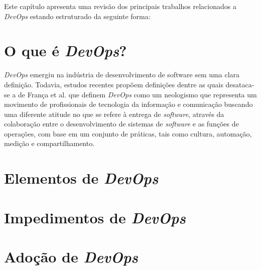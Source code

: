 \newcommand{\texCommand}[1]{\texttt{\textbackslash{#1}}}%

\newcommand{\exemplo}[1]{%
\vspace{\baselineskip}%
\noindent\fbox{\begin{minipage}{\textwidth}#1\end{minipage}}%
\\\vspace{\baselineskip}}%

\newcommand{\exemploVerbatim}[1]{%
\vspace{\baselineskip}%
\noindent\fbox{\begin{minipage}{\textwidth}%
#1\end{minipage}}%
\\\vspace{\baselineskip}}%

Este capítulo apresenta uma revisão dos principais trabalhos relacionados a
\textit{DevOps} estando estruturado da seguinte forma:

\section{O que é \textit{DevOps}?}

\textit{DevOps} emergiu na indústria de desenvolvimento de software sem uma
clara definição. Todavia, estudos recentes propõem definições
dentre as quais desataca-se a de França et al. \cite{characterizing_devops}
que definem \textit{DevOps} como um neologismo que representa um movimento de
profissionais de tecnologia da informação e comunicação buscando uma
diferente atitude no que se refere à entrega de \textit{software},
através da colaboração entre o desenvolvimento de sistemas de
\textit{software} e as funções de operações, com base em um conjunto
de práticas, tais como cultura, automação, medição e compartilhamento.

\section{Elementos de \textit{DevOps}}

\section{Impedimentos de \textit{DevOps}}

\section{Adoção de \textit{DevOps}}



